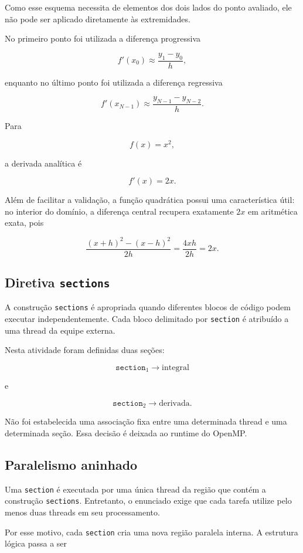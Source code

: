 Como esse esquema necessita de elementos dos dois lados do ponto avaliado,
ele não pode ser aplicado diretamente às extremidades.

No primeiro ponto foi utilizada a diferença progressiva

\[
f'(x_0)
\approx
\frac{y_1-y_0}{h},
\]

enquanto no último ponto foi utilizada a diferença regressiva

\[
f'(x_{N-1})
\approx
\frac{y_{N-1}-y_{N-2}}{h}.
\]

Para

\[
f(x)=x^2,
\]

a derivada analítica é

\[
f'(x)=2x.
\]

Além de facilitar a validação, a função quadrática possui uma característica
útil: no interior do domínio, a diferença central recupera exatamente $2x$
em aritmética exata, pois

\[
\frac{(x+h)^2-(x-h)^2}{2h}
=
\frac{4xh}{2h}
=
2x.
\]


\subsection{Diretiva \texttt{sections}}

A construção \texttt{sections} é apropriada quando diferentes blocos de
código podem executar independentemente. Cada bloco delimitado por
\texttt{section} é atribuído a uma thread da equipe externa.

Nesta atividade foram definidas duas seções:

\[
\texttt{section}_1
\longrightarrow
\text{integral}
\]

e

\[
\texttt{section}_2
\longrightarrow
\text{derivada}.
\]

Não foi estabelecida uma associação fixa entre uma determinada thread e uma
determinada seção. Essa decisão é deixada ao runtime do OpenMP.


\subsection{Paralelismo aninhado}

Uma \texttt{section} é executada por uma única thread da região que contém a
construção \texttt{sections}. Entretanto, o enunciado exige que cada tarefa
utilize pelo menos duas threads em seu processamento.

Por esse motivo, cada \texttt{section} cria uma nova região paralela interna.
A estrutura lógica passa a ser

